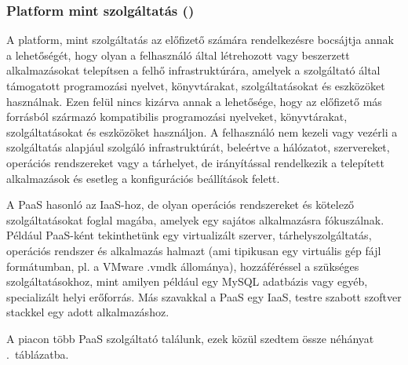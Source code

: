 \subsubsection{Platform mint szolgáltatás ()}

A platform, mint szolgáltatás az előfizető számára rendelkezésre bocsájtja annak a lehetőségét, hogy olyan a felhasználó által létrehozott vagy beszerzett alkalmazásokat telepítsen a felhő infrastruktúrára, amelyek a szolgáltató által támogatott programozási nyelvet, könyvtárakat, szolgáltatásokat és eszközöket használnak. Ezen felül nincs kizárva  annak a lehetősége, hogy az előfizető más forrásból származó kompatibilis programozási nyelveket, könyvtárakat, szolgáltatásokat és eszközöket használjon. A felhasználó nem kezeli vagy vezérli a szolgáltatás alapjául szolgáló infrastruktúrát, beleértve a hálózatot, szervereket, operációs rendszereket vagy a tárhelyet, de irányítással rendelkezik a telepített alkalmazások és esetleg a konfigurációs beállítások felett\cite{nistsp800-145}.

A PaaS hasonló az IaaS-hoz, de olyan operációs rendszereket és kötelező szolgáltatásokat foglal magába, amelyek egy sajátos alkalmazásra fókuszálnak. Például PaaS-ként tekinthetünk egy virtualizált szerver, tárhelyszolgáltatás, operációs rendszer és alkalmazás halmazt (ami tipikusan egy virtuális gép fájl formátumban, pl. a VMware .vmdk állománya), hozzáféréssel a szükséges szolgáltatásokhoz, mint amilyen például egy MySQL adatbázis vagy egyéb, specializált helyi erőforrás. Más szavakkal a PaaS egy IaaS, testre szabott szoftver stackkel egy adott alkalmazáshoz\cite{ccwlinux}.

A piacon több PaaS szolgáltató találunk, ezek közül szedtem össze néhányat .~táblázatba.

